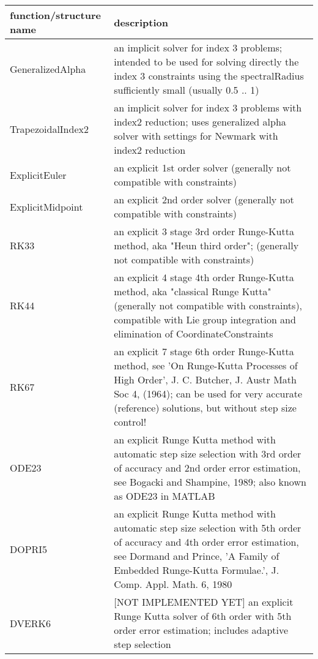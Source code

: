 \begin{center}
\footnotesize
\begin{longtable}{| p{8cm} | p{8cm} |} 
\hline
{\bf function/structure name} & {\bf description}\\ \hline
  GeneralizedAlpha & an implicit solver for index 3 problems; intended to be used for solving directly the index 3 constraints using the spectralRadius sufficiently small (usually 0.5 .. 1)\\ \hline  
  TrapezoidalIndex2 & an implicit solver for index 3 problems with index2 reduction; uses generalized alpha solver with settings for Newmark with index2 reduction\\ \hline  
  ExplicitEuler & an explicit 1st order solver (generally not compatible with constraints)\\ \hline  
  ExplicitMidpoint & an explicit 2nd order solver (generally not compatible with constraints)\\ \hline  
  RK33 & an explicit 3 stage 3rd order Runge-Kutta method, aka "Heun third order"; (generally not compatible with constraints)\\ \hline  
  RK44 & an explicit 4 stage 4th order Runge-Kutta method, aka "classical Runge Kutta" (generally not compatible with constraints), compatible with Lie group integration and elimination of CoordinateConstraints\\ \hline  
  RK67 & an explicit 7 stage 6th order Runge-Kutta method, see 'On Runge-Kutta Processes of High Order', J. C. Butcher, J. Austr Math Soc 4, (1964); can be used for very accurate (reference) solutions, but without step size control!\\ \hline  
  ODE23 & an explicit Runge Kutta method with automatic step size selection with 3rd order of accuracy and 2nd order error estimation, see Bogacki and Shampine, 1989; also known as ODE23 in MATLAB\\ \hline  
  DOPRI5 & an explicit Runge Kutta method with automatic step size selection with 5th order of accuracy and 4th order error estimation, see  Dormand and Prince, 'A Family of Embedded Runge-Kutta Formulae.', J. Comp. Appl. Math. 6, 1980\\ \hline  
  DVERK6 & [NOT IMPLEMENTED YET] an explicit Runge Kutta solver of 6th order with 5th order error estimation; includes adaptive step selection\\ \hline  
\end{longtable}
\end{center}

